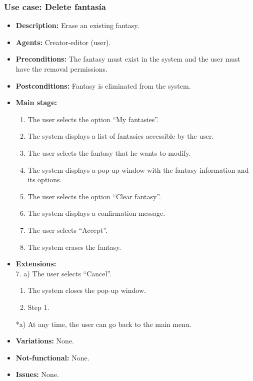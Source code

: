 \subsubsection{Use case: Delete fantasía}
\begin{itemize}
	\item \textbf{Description:} Erase an existing fantasy.
	\item \textbf{Agents:} Creator-editor (user).
	\item \textbf{Preconditions:} The fantasy must exist in the system and the user must have the removal permissions.
	\item \textbf{Postconditions:} Fantasy is eliminated from the system.
	\item \textbf{Main stage:}
	\begin{enumerate}
		\item The user selects the option ``My fantasies''.
		\item The system displays a list of fantasies accessible by the user.
		\item The user selects the fantasy that he wants to modify.
		\item The system displays a pop-up window with the fantasy information and its options.
		\item The user selects the option ``Clear fantasy''.
		\item The system displays a confirmation message.
		\item The user selects ``Accept''.
		\item The system erases the fantasy.
	\end{enumerate}
	\item \textbf{Extensions:}  \\7. a) The user selects ``Cancel''.
	\begin{enumerate}
		\item The system closes the pop-up window.
		\item Step 1.
	\end{enumerate}
	*a) At any time, the user can go back to the main menu.
	\item \textbf{Variations:} None.
	\item \textbf{Not-functional:} None.
	\item \textbf{Issues:} None.
\end{itemize}


